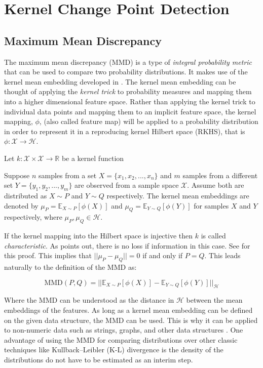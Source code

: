 \chapter{Kernel Change Point Detection}

\section{Maximum Mean Discrepancy}
\label{mmd}
The maximum mean discrepancy (MMD) is a type of \textit{integral probability metric} that can be used to compare two probability distributions. It makes use of the kernel mean embedding developed in \cite{smola2007hilbert}. The kernel mean embedding can be thought of applying the \textit{kernel trick} to probability measures and mapping them into a higher dimensional feature space. Rather than applying the kernel trick to individual data points and mapping them to an implicit feature space, the kernel mapping, $\phi$, (also called feature map) will be applied to a probability distribution in order to represent it in a reproducing kernel Hilbert space (RKHS), that is $\phi: \mathcal{X} \rightarrow \mathcal{H}$.

Let $k: \mathcal{X} \times \mathcal{X} \to \mathbb{R}$ be a kernel function 

Suppose $n$ samples from a set $X = \{x_1, x_2, ..., x_n\}$ and $m$ samples from a different set $Y=\{y_1, y_2, ..., y_m\}$ are observed from a sample space $\mathcal{X}$. Assume both are distributed as $X \sim  P$ and $Y \sim Q$ respectively. The kernel mean embeddings are denoted by $\mu_P = \mathbb{E}_{X \sim P}[\phi(X)] $ and $\mu_Q =\mathbb{E}_{Y \sim Q}[\phi(Y)]$ for samples $X$ and $Y$ respectively, where $\mu_P, \mu_Q \in \mathcal{H}$.

If the kernel mapping into the Hilbert space is injective then $k$ is called  \textit{characteristic}. As \cite{muandet2017kernel} points out, there is no loss if information in this case. See \cite{fukumizu2008kernel} for this proof. This implies that $||\mu_P - \mu_Q ||=0$ if and only if $P=Q$. This leads naturally to the definition of the MMD as:

\begin{equation}
\text{MMD}(P,Q)=|| \mathbb{E}_{X \sim P}[\phi(X)] -  \mathbb{E}_{Y \sim Q}[\phi(Y)]||_\mathcal{H}
\end{equation}

Where the MMD can be understood as the distance in $\mathcal{H}$ between the mean embeddings of the features. As long as a kernel mean embedding can be defined on the given data structure, the MMD can be used. This is why it can be applied to non-numeric data such as strings, graphs, and other data structures \cite{hofmann2008kernel}. One advantage of using the MMD for comparing distributions over other classic techniques like Kullback–Leibler (K-L) divergence is the density of the distributions do not have to be estimated as an interim step. 


